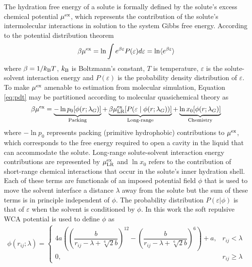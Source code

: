 \documentclass[journal=jacsat,articletitle=true,manuscript=suppinfo,layout=onecolumn]{achemso}
\begin{document}
    The hydration free energy of a solute is formally defined by the solute's excess chemical potential $\mu^{\rm{ex}}$, which represents the contribution of the solute's intermolecular interactions in solution to the system Gibbs free energy. According to the potential distribution theorem \cite{Beck2006}
    \begin{eqnarray}
    \beta \mu^{\rm{ex}} = \ln \int e^{\beta \varepsilon} P(\varepsilon) d\varepsilon = \ln \langle e^{\beta \varepsilon} \rangle
    \label{eq:pdt}
    \end{eqnarray}
    where $\beta = 1/k_{\rm B}T$, $k_{\rm B}$ is Boltzmann's constant, $T$ is temperature, $\varepsilon$ is the solute-solvent interaction energy and $P(\varepsilon)$ is the probability density distribution of $\varepsilon$. To make $\mu^{\rm{ex}}$ amenable to estimation from molecular simulation, Equation \ref{eq:pdt} may be partitioned according to molecular quasichemical theory as \cite{Asthagiri2021b, Weber2012, Tomar2016, Adhikari2022, Weber2011}
    \begin{eqnarray}
    \beta \mu^{\rm{ex}} = \underbrace{- \ln p_0[\phi(r; \lambda_G)]}_\text{Packing} + \underbrace{\beta\mu^{\rm{ex}}_{\rm{LR}}[P(\varepsilon \; | \; \phi(r; \lambda_G))]}_\text{Long-range} + \underbrace{\ln x_0[\phi(r; \lambda_G)]}_\text{Chemistry}
    \label{eq:qct}
    \end{eqnarray}
    where $- \ln p_0$ represents packing (primitive hydrophobic) contributions to $\mu^{\rm{ex}}$, which corresponds to the free energy required to open a cavity in the liquid that can accommodate the solute. Long-range solute-solvent interaction energy contributions are represented by $\mu^{\rm{ex}}_{\rm{LR}}$ and $\ln x_0$ refers to the contribution of short-range chemical interactions that occur in the solute's inner hydration shell. Each of these terms are functionals of an imposed potential field $\phi$ that is used to move the solvent interface a distance $\lambda$ away from the solute but the sum of these terms is in principle independent of $\phi$. The probability distribution $P(\varepsilon|\phi)$ is that of $\varepsilon$ when the solvent is conditioned by $\phi$. In this work the soft repulsive WCA potential is used to define $\phi$ as \cite{Tomar2016, Adhikari2022, Weber2012}
    \begin{eqnarray}
    \phi (r_{ij} ; \lambda) = 
    \begin{cases}
        4a \left( \left( \dfrac{b}{r_{ij} - \lambda +  \sqrt[6]{2}b} \right)^{12} - \left( \dfrac{b}{r_{ij} - \lambda +  \sqrt[6]{2}b} \right)^{6} \right) + a, &  r_{ij} < \lambda \\
        0, & r_{ij} \ge \lambda
    \end{cases}
    \label{eq:wca_potential}
    \end{eqnarray}
\end{document}
